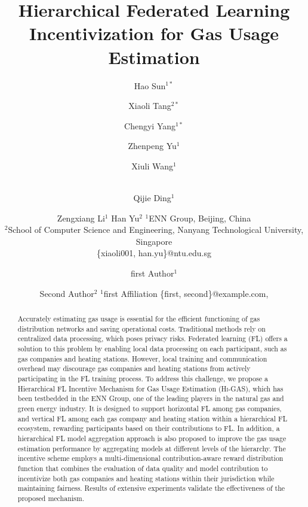 \documentclass{article}
\title{Hierarchical Federated Learning Incentivization for Gas Usage Estimation}
\author{
Hao Sun$^{1*}$
\and
Xiaoli Tang$^{2*}$
\and
Chengyi Yang$^{1*}$
\and
Zhenpeng Yu$^{1}$
\and
Xiuli Wang$^{1}$
\and\\
Qijie Ding$^{1}$
\and
Zengxiang Li$^{1}$
\And
Han Yu$^{2}$
\affiliations
$^{1}$ENN Group, Beijing, China\\
$^{2}$School of Computer Science and Engineering, Nanyang Technological University, Singapore\\
\emails
\{xiaoli001, han.yu\}@ntu.edu.sg
}
\author{
first Author$^1$
\and
Second Author$^2$
\affiliations
$^1$first Affiliation
\emails
\{first, second\}@example.com,
}
\newcommand{\methodname}{\textsc{Hi-GAS}}
\begin{document}
\maketitle

\begin{abstract}
Accurately estimating gas usage is essential for the efficient functioning of gas distribution networks and saving operational costs. Traditional methods rely on centralized data processing, which poses privacy risks. Federated learning (FL) offers a solution to this problem by enabling local data processing on each participant, such as gas companies and heating stations. However, local training and communication overhead may discourage gas companies and heating stations from actively participating in the FL training process.
To address this challenge, we propose a Hierarchical FL Incentive Mechanism for Gas Usage Estimation (\methodname{}), which has been testbedded in the ENN Group, one of the leading players in the natural gas and green energy industry. It is designed to support horizontal FL among gas companies, and vertical FL among each gas company and heating station within a hierarchical FL ecosystem, rewarding participants based on their contributions to FL.
In addition, a hierarchical FL model aggregation approach is also proposed to improve the gas usage estimation performance by aggregating models at different levels of the hierarchy. The incentive scheme employs a multi-dimensional contribution-aware reward distribution function that combines the evaluation of data quality and model contribution to incentivize both gas companies and heating stations within their jurisdiction while maintaining fairness. Results of extensive experiments validate the effectiveness of the proposed mechanism. 
\end{abstract}
\end{document}
